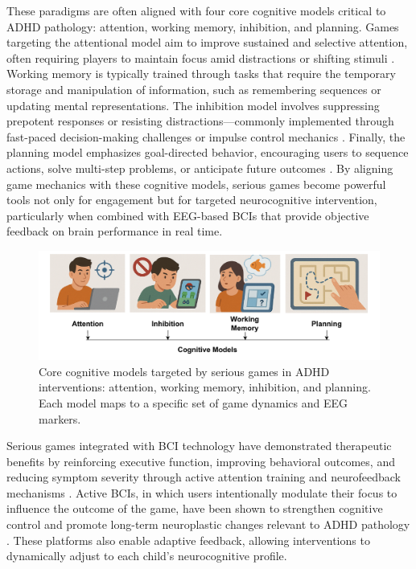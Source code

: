 These paradigms are often aligned with four core cognitive models critical to ADHD pathology: attention, working memory, inhibition, and planning. Games targeting the attentional model aim to improve sustained and selective attention, often requiring players to maintain focus amid distractions or shifting stimuli \cite{Chen2024}. Working memory is typically trained through tasks that require the temporary storage and manipulation of information, such as remembering sequences or updating mental representations. The inhibition model involves suppressing prepotent responses or resisting distractions—commonly implemented through fast-paced decision-making challenges or impulse control mechanics \cite{Takahashi2024, BreitlingZiegler2020}. Finally, the planning model emphasizes goal-directed behavior, encouraging users to sequence actions, solve multi-step problems, or anticipate future outcomes \cite{Lorini2022}. By aligning game mechanics with these cognitive models, serious games become powerful tools not only for engagement but for targeted neurocognitive intervention, particularly when combined with EEG-based BCIs that provide objective feedback on brain performance in real time.


\begin{figure}[h]
 \centering
 \includegraphics[width=1\textwidth]{Figures/cognitive.pdf}
 \caption{Core cognitive models targeted by serious games in ADHD interventions: attention, working memory, inhibition, and planning. Each model maps to a specific set of game dynamics and EEG markers.}
 \label{fig:cognitive_models}
\end{figure}



Serious games integrated with BCI technology have demonstrated therapeutic benefits by reinforcing executive function, improving behavioral outcomes, and reducing symptom severity through active attention training and neurofeedback mechanisms \cite{Doulou2025}. Active BCIs, in which users intentionally modulate their focus to influence the outcome of the game, have been shown to strengthen cognitive control and promote long-term neuroplastic changes relevant to ADHD pathology \cite{Cervantes2023}. These platforms also enable adaptive feedback, allowing interventions to dynamically adjust to each child's neurocognitive profile.

